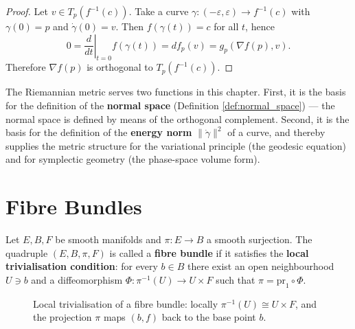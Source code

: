 \begin{proof}
Let $v \in T_p(f^{-1}(c))$. Take a curve $\gamma: (-\varepsilon, \varepsilon) \to f^{-1}(c)$ with $\gamma(0) = p$ and $\dot{\gamma}(0) = v$. Then $f(\gamma(t)) = c$ for all $t$, hence
\[
0 = \left. \frac{d}{dt} \right|_{t=0} f(\gamma(t)) = df_p(v) = g_p(\nabla f(p), v).
\]
Therefore $\nabla f(p)$ is orthogonal to $T_p(f^{-1}(c))$.
\end{proof}

\begin{remark}\label{rem:riemannian_central}
The Riemannian metric serves two functions in this chapter. First, it is the basis for the definition of the \textbf{normal space} (Definition \ref{def:normal_space}) --- the normal space is defined by means of the orthogonal complement. Second, it is the basis for the definition of the \textbf{energy norm} $\|\dot{\gamma}\|^2$ of a curve, and thereby supplies the metric structure for the variational principle (the geodesic equation) and for symplectic geometry (the phase-space volume form).
\end{remark}

\section{Fibre Bundles}

\begin{definition}\label{def:fibre_bundle}
Let $E, B, F$ be smooth manifolds and $\pi: E \to B$ a smooth surjection. The quadruple $(E, B, \pi, F)$ is called a \textbf{fibre bundle} if it satisfies the \textbf{local trivialisation condition}: for every $b \in B$ there exist an open neighbourhood $U \ni b$ and a diffeomorphism $\Phi: \pi^{-1}(U) \to U \times F$ such that $\pi = \text{pr}_1 \circ \Phi$.
\end{definition}

\begin{figure}[htbp]
\centering
{}
\caption{Local trivialisation of a fibre bundle: locally $\pi^{-1}(U)\cong U\times F$, and the projection $\pi$ maps $(b,f)$ back to the base point $b$.}
\label{fig:fibre_bundle}
\end{figure}

